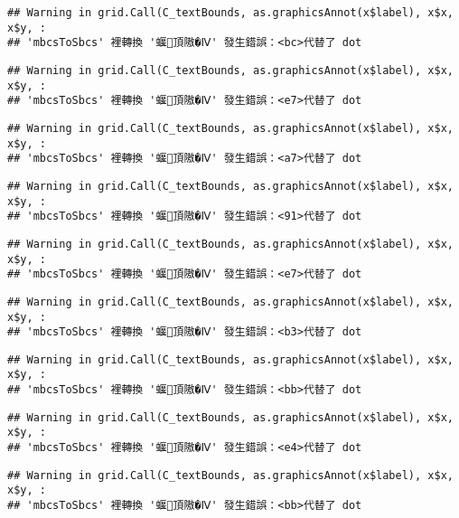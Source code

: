 \documentclass[
]{article}
\begin{document}
\begin{verbatim}
## Warning in grid.Call(C_textBounds, as.graphicsAnnot(x$label), x$x, x$y, :
## 'mbcsToSbcs' 裡轉換 '蝘頂隞�Ⅳ' 發生錯誤：<bc>代替了 dot
\end{verbatim}

\begin{verbatim}
## Warning in grid.Call(C_textBounds, as.graphicsAnnot(x$label), x$x, x$y, :
## 'mbcsToSbcs' 裡轉換 '蝘頂隞�Ⅳ' 發生錯誤：<e7>代替了 dot
\end{verbatim}

\begin{verbatim}
## Warning in grid.Call(C_textBounds, as.graphicsAnnot(x$label), x$x, x$y, :
## 'mbcsToSbcs' 裡轉換 '蝘頂隞�Ⅳ' 發生錯誤：<a7>代替了 dot
\end{verbatim}

\begin{verbatim}
## Warning in grid.Call(C_textBounds, as.graphicsAnnot(x$label), x$x, x$y, :
## 'mbcsToSbcs' 裡轉換 '蝘頂隞�Ⅳ' 發生錯誤：<91>代替了 dot
\end{verbatim}

\begin{verbatim}
## Warning in grid.Call(C_textBounds, as.graphicsAnnot(x$label), x$x, x$y, :
## 'mbcsToSbcs' 裡轉換 '蝘頂隞�Ⅳ' 發生錯誤：<e7>代替了 dot
\end{verbatim}

\begin{verbatim}
## Warning in grid.Call(C_textBounds, as.graphicsAnnot(x$label), x$x, x$y, :
## 'mbcsToSbcs' 裡轉換 '蝘頂隞�Ⅳ' 發生錯誤：<b3>代替了 dot
\end{verbatim}

\begin{verbatim}
## Warning in grid.Call(C_textBounds, as.graphicsAnnot(x$label), x$x, x$y, :
## 'mbcsToSbcs' 裡轉換 '蝘頂隞�Ⅳ' 發生錯誤：<bb>代替了 dot
\end{verbatim}

\begin{verbatim}
## Warning in grid.Call(C_textBounds, as.graphicsAnnot(x$label), x$x, x$y, :
## 'mbcsToSbcs' 裡轉換 '蝘頂隞�Ⅳ' 發生錯誤：<e4>代替了 dot
\end{verbatim}

\begin{verbatim}
## Warning in grid.Call(C_textBounds, as.graphicsAnnot(x$label), x$x, x$y, :
## 'mbcsToSbcs' 裡轉換 '蝘頂隞�Ⅳ' 發生錯誤：<bb>代替了 dot
\end{verbatim}
\end{document}

